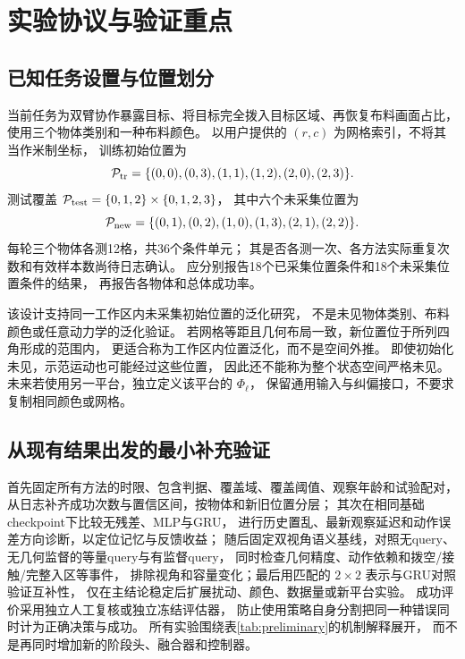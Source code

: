 \section{实验协议与验证重点}


\subsection{已知任务设置与位置划分}
当前任务为双臂协作暴露目标、将目标完全拨入目标区域、再恢复布料画面占比，
使用三个物体类别和一种布料颜色。
以用户提供的 $(r,c)$ 为网格索引，不将其当作米制坐标，
训练初始位置为
\begin{equation}
 \mathcal P_{\rm tr}=
 \{(0,0),(0,3),(1,1),(1,2),(2,0),(2,3)\}.
\end{equation}
测试覆盖
$\mathcal P_{\rm test}=\{0,1,2\}\times\{0,1,2,3\}$，
其中六个未采集位置为
\begin{equation}
 \mathcal P_{\rm new}=
 \{(0,1),(0,2),(1,0),(1,3),(2,1),(2,2)\}.
\end{equation}
每轮三个物体各测12格，共36个条件单元；
其是否各测一次、各方法实际重复次数和有效样本数尚待日志确认。
应分别报告18个已采集位置条件和18个未采集位置条件的结果，
再报告各物体和总体成功率。

该设计支持同一工作区内未采集初始位置的泛化研究，
不是未见物体类别、布料颜色或任意动力学的泛化验证。
若网格等距且几何布局一致，新位置位于所列四角形成的范围内，
更适合称为工作区内位置泛化，而不是空间外推。
即使初始化未见，示范运动也可能经过这些位置，
因此还不能称为整个状态空间严格未见。
未来若使用另一平台，独立定义该平台的 $\Phi_\ell$，
保留通用输入与纠偏接口，不要求复制相同颜色或网格。

\subsection{从现有结果出发的最小补充验证}
首先固定所有方法的时限、包含判据、覆盖域、覆盖阈值、观察年龄和试验配对，
从日志补齐成功次数与置信区间，按物体和新旧位置分层；
其次在相同基础checkpoint下比较无残差、MLP与GRU，
进行历史置乱、最新观察延迟和动作误差方向诊断，以定位记忆与反馈收益；
随后固定双视角语义基线，对照无query、无几何监督的等量query与有监督query，
同时检查几何精度、动作依赖和拨空/接触/完整入区等事件，
排除视角和容量变化；最后用匹配的 $2\times2$ 表示与GRU对照验证互补性，
仅在主结论稳定后扩展扰动、颜色、数据量或新平台实验。
成功评价采用独立人工复核或独立冻结评估器，
防止使用策略自身分割把同一种错误同时计为正确决策与成功。
所有实验围绕表\ref{tab:preliminary}的机制解释展开，
而不是再同时增加新的阶段头、融合器和控制器。

